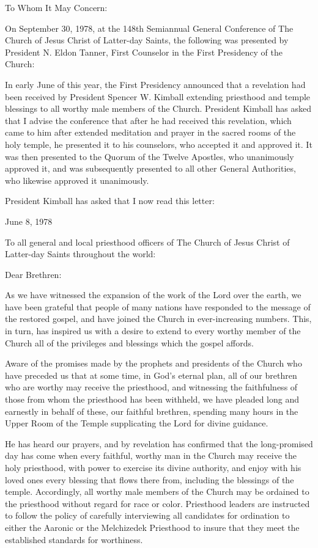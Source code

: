 \documentclass{article}
\begin{document}
\begin{displayquote}
To Whom It May Concern:

On September 30, 1978, at the 148th Semiannual General Conference of The 
Church of Jesus Christ of Latter-day Saints, the following was presented by 
President N. Eldon Tanner, First Counselor in the First Presidency of the 
Church:

In early June of this year, the First Presidency announced that a revelation 
had been received by President Spencer W. Kimball extending priesthood and 
temple blessings to all worthy male members of the Church. President Kimball 
has asked that I advise the conference that after he had received this 
revelation, which came to him after extended meditation and prayer in the 
sacred rooms of the holy temple, he presented it to his counselors, who 
accepted it and approved it. It was then presented to the Quorum of the 
Twelve Apostles, who unanimously approved it, and was subsequently presented 
to all other General Authorities, who likewise approved it unanimously.

President Kimball has asked that I now read this letter:

June 8, 1978

To all general and local priesthood officers of The Church of Jesus Christ 
of Latter-day Saints throughout the world:

Dear Brethren:

As we have witnessed the expansion of the work of the Lord over the earth, we 
have been grateful that people of many nations have responded to the message 
of the restored gospel, and have joined the Church in ever-increasing numbers. 
This, in turn, has inspired us with a desire to extend to every worthy member 
of the Church all of the privileges and blessings which the gospel affords.

Aware of the promises made by the prophets and presidents of the Church who have 
preceded us that at some time, in God’s eternal plan, all of our brethren who 
are worthy may receive the priesthood, and witnessing the faithfulness of those 
from whom the priesthood has been withheld, we have pleaded long and earnestly 
in behalf of these, our faithful brethren, spending many hours in the Upper Room 
of the Temple supplicating the Lord for divine guidance.

He has heard our prayers, and by revelation has confirmed that the long-promised 
day has come when every faithful, worthy man in the Church may receive the holy 
priesthood, with power to exercise its divine authority, and enjoy with his 
loved ones every blessing that flows there from, including the blessings of the 
temple. Accordingly, all worthy male members of the Church may be ordained to 
the priesthood without regard for race or color. Priesthood leaders are 
instructed to follow the policy of carefully interviewing all candidates for 
ordination to either the Aaronic or the Melchizedek Priesthood to insure that 
they meet the established standards for worthiness.


\end{displayquote}
\end{document}
